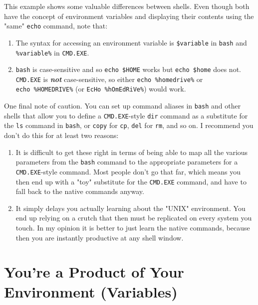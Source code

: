 \documentclass[10pt,american,]{book}
\numberwithin{figure}{chapter}
\begin{document}
This example shows some valuable differences between shells. Even though
both have the concept of environment variables and displaying their
contents using the "same" \texttt{echo} command, note that:

\begin{enumerate}
\def\labelenumi{\arabic{enumi}.}
\item
  The syntax for accessing an environment variable is
  \texttt{\$variable} in
  \texttt{bash} and \texttt{\%variable\%} in \texttt{CMD.EXE}.
\item
  \texttt{bash} is case-sensitive and so \texttt{echo\ \$HOME} works but
  \texttt{echo\ \$home} does not. \texttt{CMD.EXE} is
  \textbf{\emph{not}} case-sensitive, so either
  \texttt{echo\ \%homedrive\%} or \texttt{echo\ \%HOMEDRIVE\%} (or
  \texttt{EcHo\ \%hOmEdRiVe\%}) would work.
\end{enumerate}

One final note of caution. You can set up command aliases in
\texttt{bash} and other shells that allow you to define a
\texttt{CMD.EXE}-style \texttt{dir} command as a substitute for the
\texttt{ls} command in \texttt{bash}, or \texttt{copy} for \texttt{cp},
\texttt{del} for \texttt{rm}, and so on. I recommend you don't do this
for at least two reasons:

\begin{enumerate}
\def\labelenumi{\arabic{enumi}.}
\item
  It is difficult to get these right in terms of being able to map all
  the various parameters from the \texttt{bash} command to the
  appropriate parameters for a \texttt{CMD.EXE}-style command. Most
  people don't go that far, which means you then end up with a "toy"
  substitute for the \texttt{CMD.EXE} command, and have to fall back to
  the native commands anyway.
\item
  It simply delays you actually learning about the "UNIX" environment.
  You end up relying on a crutch that then must be replicated on every
  system you touch. In my opinion it is better to just learn the native
  commands, because then you are instantly productive at any shell
  window.
\end{enumerate}

\section*{You're a Product of Your Environment
(Variables)}\label{youre-a-product-of-your-environment-variables}
\end{document}

